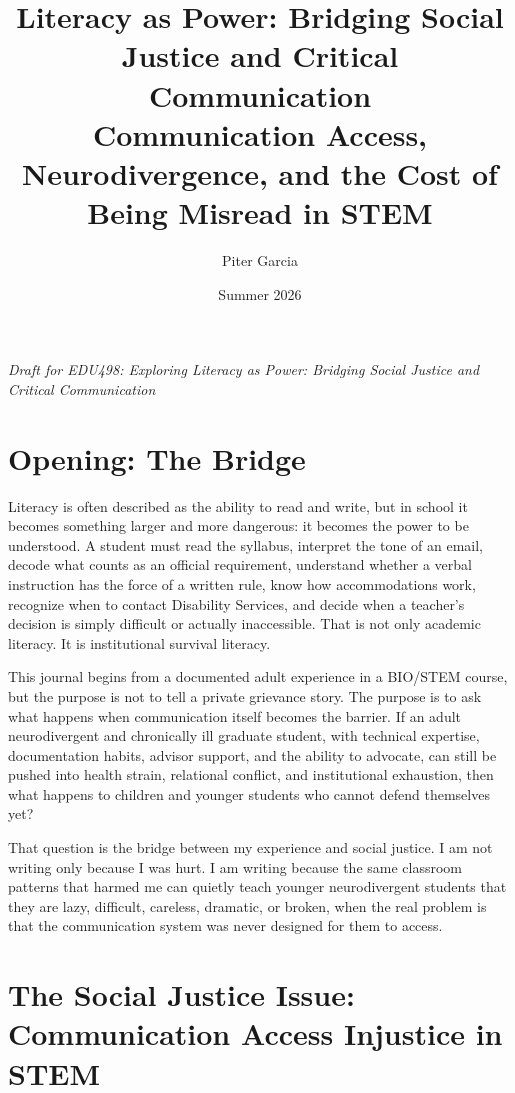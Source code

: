 \documentclass[12pt]{article}
\title{Literacy as Power: Bridging Social Justice and Critical Communication\\
\large Communication Access, Neurodivergence, and the Cost of Being Misread in STEM}
\author{Piter Garcia}
\date{Summer 2026}
\begin{document}
\maketitle

\begin{center}
\textit{Draft for EDU498: Exploring Literacy as Power: Bridging Social Justice and Critical Communication}
\end{center}

\section*{Opening: The Bridge}

Literacy is often described as the ability to read and write, but in school it becomes something larger and more dangerous: it becomes the power to be understood. A student must read the syllabus, interpret the tone of an email, decode what counts as an official requirement, understand whether a verbal instruction has the force of a written rule, know how accommodations work, recognize when to contact Disability Services, and decide when a teacher's decision is simply difficult or actually inaccessible. That is not only academic literacy. It is institutional survival literacy.

This journal begins from a documented adult experience in a BIO/STEM course, but the purpose is not to tell a private grievance story. The purpose is to ask what happens when communication itself becomes the barrier. If an adult neurodivergent and chronically ill graduate student, with technical expertise, documentation habits, advisor support, and the ability to advocate, can still be pushed into health strain, relational conflict, and institutional exhaustion, then what happens to children and younger students who cannot defend themselves yet?

That question is the bridge between my experience and social justice. I am not writing only because I was hurt. I am writing because the same classroom patterns that harmed me can quietly teach younger neurodivergent students that they are lazy, difficult, careless, dramatic, or broken, when the real problem is that the communication system was never designed for them to access.

\section*{The Social Justice Issue: Communication Access Injustice in STEM}
\end{document}
